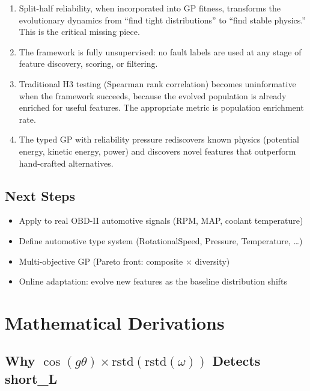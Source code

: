 \documentclass[11pt,a4paper]{article}
\begin{document}
\begin{enumerate}
    \item Split-half reliability, when incorporated into GP fitness, transforms
    the evolutionary dynamics from ``find tight distributions'' to ``find stable
    physics.'' This is the critical missing piece.

    \item The framework is fully unsupervised: no fault labels are used at any
    stage of feature discovery, scoring, or filtering.

    \item Traditional H3 testing (Spearman rank correlation) becomes
    uninformative when the framework succeeds, because the evolved population
    is already enriched for useful features. The appropriate metric is
    population enrichment rate.

    \item The typed GP with reliability pressure rediscovers known physics
    (potential energy, kinetic energy, power) and discovers novel features
    that outperform hand-crafted alternatives.
\end{enumerate}

\subsection{Next Steps}

\begin{itemize}
    \item Apply to real OBD-II automotive signals (RPM, MAP, coolant temperature)
    \item Define automotive type system (RotationalSpeed, Pressure, Temperature, \ldots)
    \item Multi-objective GP (Pareto front: composite $\times$ diversity)
    \item Online adaptation: evolve new features as the baseline distribution shifts
\end{itemize}

\appendix
\section{Mathematical Derivations}

\subsection{Why $\cos(g\theta) \times \text{rstd}(\text{rstd}(\omega))$ Detects short\_L}
\end{document}
